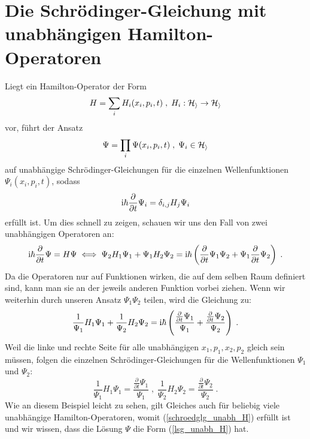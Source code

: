 \section{Die Schrödinger-Gleichung mit unabhängigen Hamilton-Operatoren}
  Liegt ein Hamilton-Operator der Form
  \begin{equation}
    H = \sum_i H_i(x_i,p_i,t) \;,\; H_i : \cal H_i \rightarrow H_i
    \label{unabh_H}
  \end{equation}
  vor, führt der Ansatz
  \begin{equation}
    \Psi = \prod_i \Psi(x_i,p_i,t) \; , \; \Psi_i \in \cal H_i
    \label{lsg_unabh_H}
  \end{equation}
  auf unabhängige Schrödinger-Gleichungen für die einzelnen Wellenfunktionen \\ $\Psi_i(x_i,p_i,t)$, sodass \cite{online quelle}
  \begin{equation}
    \text i \hbar \frac{\partial}{\partial t}\Psi_i = \delta_{i,j}  H_j \Psi_i
    \label{schroedglg_unabh_H}
  \end{equation}
  erfüllt ist.
  Um dies schnell zu zeigen, schauen wir uns den Fall von zwei unabhängigen Operatoren an:
  \begin{align}
    \begin{split}
      \text i \hbar \frac{\partial}{\partial t} \Psi = H\Psi \iff \Psi_2 H_1 \Psi_1 + \Psi_1 H_2 \Psi_2 = \text i \hbar \left(\frac{\partial}{\partial t} \Psi_1\Psi_2 + \Psi_1\frac{\partial}{\partial t} \Psi_2 \right) \; .
    \end{split}
  \end{align}
  Da die Operatoren nur auf Funktionen wirken, die auf dem selben Raum definiert sind, kann man sie an der jeweils anderen Funktion vorbei ziehen.
  Wenn wir weiterhin durch unseren Ansatz $\Psi_1\Psi_2$ teilen, wird die Gleichung zu:
  \begin{equation}
    \frac{1}{\Psi_1}H_1\Psi_1 + \frac{1}{\Psi_2}H_2\Psi_2 = \text i \hbar \left(\frac{\frac{\partial}{\partial t} \Psi_1}{\Psi_1} + \frac{\frac{\partial}{\partial t} \Psi_2}{\Psi_2} \right) \; .
  \end{equation}
  Weil die linke und rechte Seite für alle unabhängigen $x_1,p_1,x_2,p_2$ gleich sein müssen, folgen die einzelnen Schrödinger-Gleichungen für die Wellenfunktionen $\Psi_1$ und $\Psi_2$:
  \begin{equation}
    \frac{1}{\Psi_1}H_1\Psi_1 = \frac{\frac{\partial}{\partial t} \Psi_1}{\Psi_1} \; , \; \frac{1}{\Psi_2}H_2\Psi_2 = \frac{\frac{\partial}{\partial t} \Psi_2}{\Psi_2} \; .
  \end{equation}
  Wie an diesem Beispiel leicht zu sehen, gilt Gleiches auch für beliebig viele unabhängige Hamilton-Operatoren, womit (\ref{schroedglg_unabh_H}) erfüllt ist und wir wissen, dass die Lösung $\Psi$ die Form (\ref{lsg_unabh_H}) hat.



